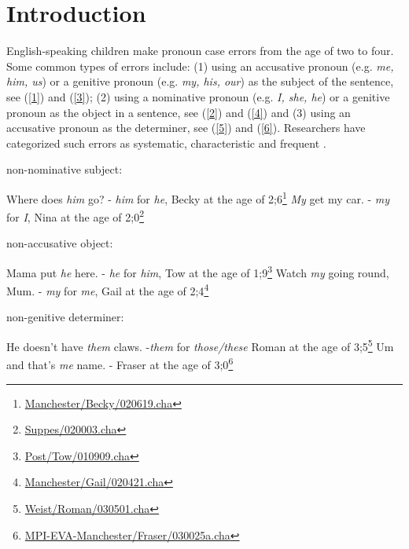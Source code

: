 \section{Introduction}
English-speaking children make pronoun case errors from the age of two to four. Some common types of errors include: (1) using an accusative pronoun (e.g. \textit{me, him, us}) or a genitive pronoun (e.g. \textit{my, his, our}) as the subject of the sentence, see (\ref{1}) and (\ref{3}); (2) using a nominative pronoun (e.g. \textit{I, she, he}) or a genitive pronoun as the object in a sentence, see (\ref{2}) and (\ref{4}) and (3) using an accusative pronoun as the determiner, see (\ref{5}) and (\ref{6}). Researchers have categorized such errors as systematic, characteristic and frequent \citep[e.g.][]{huxley1970development, budwig1989linguistic, pelham2011input,fitzgerald2017case}.

\begin{exe}
\ex \label{01} non-nominative subject:
\begin{xlist}
\ex \label{1} {Where does \textit{him} go? - \textit{him} for \textit{he}, Becky at the age of 2;6\footnote{\href{https://childes.talkbank.org/browser/index.php?url=Eng-UK/Manchester/Becky/020619.cha}{Manchester/Becky/020619.cha}
}}
\ex \label{3} {\textit{My} get my car. - \textit{my} for \textit{I}, Nina at the age of 2;0\footnote{\href{https://childes.talkbank.org/browser/index.php?url=Eng-NA/Suppes/020003.cha}{Suppes/020003.cha}}}
\end{xlist}
\ex non-accusative object:
\begin{xlist}
\ex \label{2} {Mama put \textit{he} here. - \textit{he} for \textit{him}, Tow at the age of 1;9\footnote{\href{https://childes.talkbank.org/browser/index.php?url=Eng-NA/Post/Tow/010909.cha}{Post/Tow/010909.cha}}}
\ex \label{4} {Watch \textit{my} going round, Mum. - \textit{my} for \textit{me}, Gail at the age of 2;4\footnote{\href{https://childes.talkbank.org/browser/index.php?url=Eng-UK/Manchester/Gail/020421.cha}{Manchester/Gail/020421.cha}}}
\end{xlist}
\ex non-genitive determiner:
\begin{xlist}
\ex \label{5} He doesn't have \textit{them} claws. -\textit{them} for \textit{those/these} Roman at the age of 3;5\footnote{\href{https://childes.talkbank.org/browser/index.php?url=Eng-NA/Weist/Roman/030501.cha}{Weist/Roman/030501.cha}}
\ex \label{6} Um and that's \textit{me} name. - Fraser at the age of 3;0\footnote{\href{https://childes.talkbank.org/browser/index.php?url=Eng-UK/MPI-EVA-Manchester/Fraser/030025a.cha}{MPI-EVA-Manchester/Fraser/030025a.cha}}
\end{xlist}
\end{exe}

